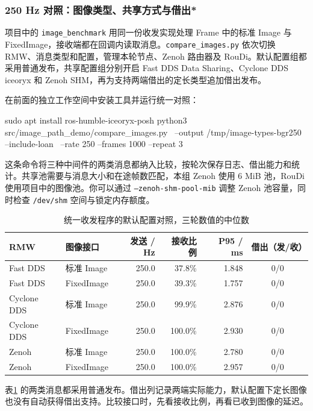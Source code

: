 \subsubsection{250 Hz 对照：图像类型、共享方式与借出*}
\label{sec:ros2-image-type-comparison}
\begin{example}
项目中的 \texttt{image\_benchmark} 用同一份收发实现处理 Frame 中的标准 Image 与 FixedImage，接收端都在回调内读取消息。\texttt{compare\_images.py} 依次切换 RMW、消息类型和配置，管理本轮节点、Zenoh 路由器及 RouDi。默认配置组都采用普通发布，共享配置组分别开启 Fast DDS Data Sharing、Cyclone DDS iceoryx 和 Zenoh SHM，再为支持两端借出的定长类型追加借出发布。

在前面的独立工作空间中安装工具并运行统一对照：
\par\medskip\noindent\begin{minipage}{\linewidth}
\begin{tbash}
sudo apt install ros-humble-iceoryx-posh
python3 src/image_path_demo/compare_images.py \
  --output /tmp/image-types-bgr250 --include-loan \
  --rate 250 --frames 1000 --repeat 3
\end{tbash}
\end{minipage}\par\smallskip
这条命令将三种中间件的两类消息都纳入比较，按轮次保存日志、借出能力和统计。共享池需要与消息大小和在途帧数匹配，本组 Zenoh 使用 6 MiB 池，RouDi 使用项目中的图像池。你可以通过 \texttt{--zenoh-shm-pool-mib} 调整 Zenoh 池容量，同时检查 \texttt{/dev/shm} 空间与锁定内存额度。

\begin{table}[htbp]
\centering
\small
\caption{统一收发程序的默认配置对照，三轮数值的中位数}
\label{tab:ros2-image-types-default}
\begin{tabular}{llrrrc}
\toprule
RMW & 图像接口 & 发送 / Hz & 接收比例 & P95 / ms & 借出（发/收）\\
\midrule
Fast DDS & 标准 Image & 250.0 & 37.8\% & 1.848 & 0/0\\
Fast DDS & FixedImage & 250.0 & 39.3\% & 1.757 & 0/0\\
\midrule
Cyclone DDS & 标准 Image & 250.0 & 99.9\% & 2.876 & 0/0\\
Cyclone DDS & FixedImage & 250.0 & 100.0\% & 2.930 & 0/0\\
\midrule
Zenoh & 标准 Image & 250.0 & 100.0\% & 2.780 & 0/0\\
Zenoh & FixedImage & 250.0 & 100.0\% & 2.957 & 0/0\\
\bottomrule
\end{tabular}
\end{table}
表\ref{tab:ros2-image-types-default} 的两类消息都采用普通发布。借出列记录两端实际能力，默认配置下定长图像也没有自动获得借出支持。比较接口时，先看接收比例，再看已收到图像的延迟。


\end{example}
